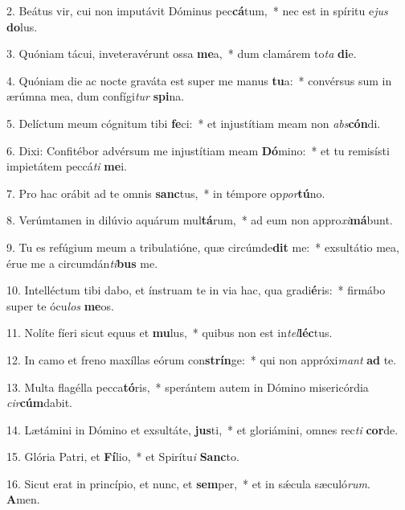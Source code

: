 2. Beátus vir, cui non imputávit Dóminus pec\textbf{cá}tum,~*  nec est in spíritu e\textit{jus} \textbf{do}lus.\

3. Quóniam tácui, inveteravérunt ossa \textbf{me}a,~*  dum clamárem to\textit{ta} \textbf{di}e.\

4. Quóniam die ac nocte graváta est super me manus \textbf{tu}a:~*  convérsus sum in ærúmna mea, dum confígi\textit{tur} \textbf{spi}na.\

5. Delíctum meum cógnitum tibi \textbf{fe}ci:~*  et injustítiam meam non \textit{abs}\textbf{cón}di.\

6. Dixi: Confitébor advérsum me injustítiam meam \textbf{Dó}mino:~*  et tu remisísti impietátem peccá\textit{ti} \textbf{me}i.\

7. Pro hac orábit ad te omnis \textbf{sanc}tus,~*  in témpore op\textit{por}\textbf{tú}no.\

8. Verúmtamen in dilúvio aquárum mul\textbf{tá}rum,~*  ad eum non appro\textit{xi}\textbf{má}bunt.\

9. Tu es refúgium meum a tribulatióne, quæ circúmde\textbf{dit} me:~*  exsultátio mea, érue me a circumdán\textit{ti}\textbf{bus} me.\

10. Intelléctum tibi dabo, et ínstruam te in via hac, qua gradi\textbf{é}ris:~*  firmábo super te ócu\textit{los} \textbf{me}os.\

11. Nolíte fíeri sicut equus et \textbf{mu}lus,~*  quibus non est in\textit{tel}\textbf{léc}tus.\

12. In camo et freno maxíllas eórum con\textbf{strín}ge:~*  qui non appróxi\textit{mant} \textbf{ad} te.\

13. Multa flagélla pecca\textbf{tó}ris,~*  sperántem autem in Dómino misericórdia \textit{cir}\textbf{cúm}dabit.\

14. Lætámini in Dómino et exsultáte, \textbf{jus}ti,~*  et gloriámini, omnes rec\textit{ti} \textbf{cor}de.\

15. Glória Patri, et \textbf{Fí}lio,~*  et Spirítu\textit{i} \textbf{Sanc}to.\

16. Sicut erat in princípio, et nunc, et \textbf{sem}per,~*  et in sǽcula sæculó\textit{rum}. \textbf{A}men.\

